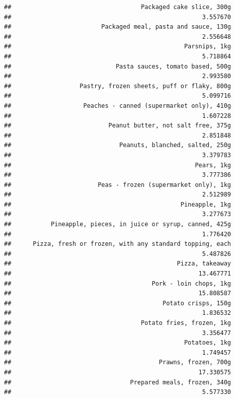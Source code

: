 \documentclass[
  landscape]{article}
\begin{document}
\begin{verbatim}
##                                    Packaged cake slice, 300g 
##                                                     3.557670 
##                         Packaged meal, pasta and sauce, 130g 
##                                                     2.556648 
##                                                Parsnips, 1kg 
##                                                     5.718864 
##                             Pasta sauces, tomato based, 500g 
##                                                     2.993580 
##                   Pastry, frozen sheets, puff or flaky, 800g 
##                                                     5.099716 
##                    Peaches - canned (supermarket only), 410g 
##                                                     1.607228 
##                           Peanut butter, not salt free, 375g 
##                                                     2.851848 
##                              Peanuts, blanched, salted, 250g 
##                                                     3.379783 
##                                                   Pears, 1kg 
##                                                     3.777386 
##                        Peas - frozen (supermarket only), 1kg 
##                                                     2.512989 
##                                               Pineapple, 1kg 
##                                                     3.277673 
##           Pineapple, pieces, in juice or syrup, canned, 425g 
##                                                     1.776420 
##      Pizza, fresh or frozen, with any standard topping, each 
##                                                     5.487826 
##                                              Pizza, takeaway 
##                                                    13.467771 
##                                       Pork - loin chops, 1kg 
##                                                    15.808587 
##                                          Potato crisps, 150g 
##                                                     1.836532 
##                                    Potato fries, frozen, 1kg 
##                                                     3.356477 
##                                                Potatoes, 1kg 
##                                                     1.749457 
##                                         Prawns, frozen, 700g 
##                                                    17.330575 
##                                 Prepared meals, frozen, 340g 
##                                                     5.577330 

\end{verbatim}
\end{document}
